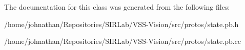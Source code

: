 The documentation for this class was generated from the following files\+:\begin{DoxyCompactItemize}
\item 
/home/johnathan/\+Repositories/\+S\+I\+R\+Lab/\+V\+S\+S-\/\+Vision/src/protos/state.\+pb.\+h\item 
/home/johnathan/\+Repositories/\+S\+I\+R\+Lab/\+V\+S\+S-\/\+Vision/src/protos/state.\+pb.\+cc\end{DoxyCompactItemize}
